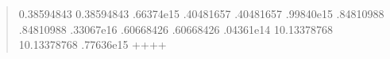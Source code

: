 \documentclass[letterpaper,10pt,english]{sphinxmanual}
\begin{document}
\begin{enumerate}
\begin{quote}
\begin{sphinxVerbatim}[commandchars=\\\{\}]
    \PYGZhy{}0.38594843          \PYGZhy{}0.38594843  .66374e\PYGZhy{}15 
     .40481657           .40481657  .99840e\PYGZhy{}15 
     .84810988           .84810988  .33067e\PYGZhy{}16 
     .60668426           .60668426  .04361e\PYGZhy{}14 
   \PYGZhy{}10.13378768         \PYGZhy{}10.13378768  .77636e\PYGZhy{}15 
+\PYGZhy{}\PYGZhy{}\PYGZhy{}\PYGZhy{}\PYGZhy{}\PYGZhy{}\PYGZhy{}\PYGZhy{}\PYGZhy{}\PYGZhy{}\PYGZhy{}\PYGZhy{}\PYGZhy{}\PYGZhy{}\PYGZhy{}\PYGZhy{}+\PYGZhy{}\PYGZhy{}\PYGZhy{}\PYGZhy{}\PYGZhy{}\PYGZhy{}\PYGZhy{}\PYGZhy{}\PYGZhy{}\PYGZhy{}\PYGZhy{}\PYGZhy{}\PYGZhy{}\PYGZhy{}\PYGZhy{}\PYGZhy{}\PYGZhy{}\PYGZhy{}\PYGZhy{}\PYGZhy{}\PYGZhy{}+\PYGZhy{}\PYGZhy{}\PYGZhy{}\PYGZhy{}\PYGZhy{}\PYGZhy{}\PYGZhy{}\PYGZhy{}\PYGZhy{}\PYGZhy{}\PYGZhy{}\PYGZhy{}\PYGZhy{}+


\end{sphinxVerbatim}
\end{quote}
\end{enumerate}
\end{document}
